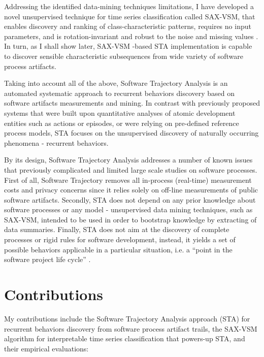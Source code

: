 Addressing the identified data-mining techniques limitations, 
I have developed a novel unsupervised technique for time series classification called SAX-VSM, that enables 
discovery and ranking of class-characteristic patterns, requires no input parameters, and is rotation-invariant 
and robust to the noise and missing values \cite{sax-vsm}. 
In turn, as I shall show later, SAX-VSM -based STA implementation is capable to discover sensible characteristic 
subsequences from wide variety of software process artifacts.

Taking into account all of the above, Software Trajectory Analysis is an automated systematic approach to 
recurrent behaviors discovery based on software artifacts measurements and mining. 
In contrast with previously proposed systems that were built upon quantitative analyses of atomic development 
entities such as actions or episodes, or were relying on pre-defined reference process models, 
STA focuses on the unsupervised discovery of naturally occurring phenomena - recurrent behaviors. 

By its design, Software Trajectory Analysis addresses a number of known issues that previously complicated and 
limited large scale studies on software processes.
First of all, Software Trajectory removes all in-process (real-time) measurement costs and privacy concerns since 
it relies solely on off-line measurements of public software artifacts. 
Secondly, STA does not depend on any prior knowledge about software processes or any model - unsupervised 
data mining techniques, such as SAX-VSM, intended to be used in order to bootstrap knowledge by extracting of 
data summaries. 
Finally, STA does not aim at the discovery of complete processes or rigid rules for software development, instead,
it yields a set of possible behaviors applicable in a particular situation, 
i.e. a ``point in the software project life cycle'' \cite{demillo1980software}.


\section{Contributions}\label{section_contributions}
My contributions include the Software Trajectory Analysis approach (STA) for recurrent behaviors discovery
from software process artifact trails, the SAX-VSM algorithm for interpretable time series classification 
that powers-up STA, and their empirical evaluations: 


